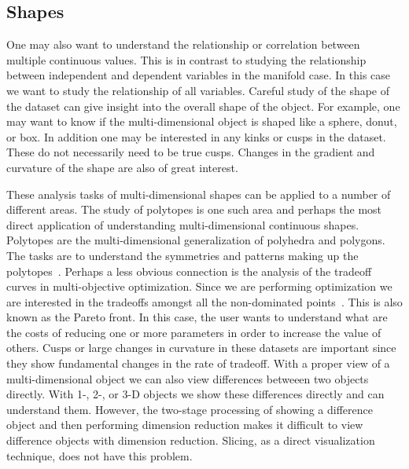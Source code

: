 \subsection{Shapes}
\label{sec:shapes}

One may also want to understand the relationship or correlation between
multiple continuous values. This is in contrast to studying the relationship
between independent and dependent variables in the manifold case. In this case
we want to study the relationship of all variables. Careful study of the shape
of the dataset can give insight into the overall shape of the object. For
example, one may want to know if the multi-dimensional object is shaped like a
sphere, donut, or box.
In addition one may be interested in any kinks or cusps in the dataset.
 These do not necessarily need to be true cusps. Changes in
the gradient and curvature of the shape are also of great interest.

These analysis tasks of multi-dimensional shapes can be applied to a number of
different areas. The study of polytopes is one such area and perhaps the most
direct application of understanding multi-dimensional continuous shapes.
Polytopes are the multi-dimensional generalization of polyhedra and polygons.
The tasks are to understand the symmetries and patterns making up the
polytopes~\cite{Ziegler}. Perhaps a less obvious connection is the analysis of
the tradeoff curves in multi-objective optimization. Since we are performing
optimization we are interested in the tradeoffs amongst all the non-dominated
points~\cite{nondominated}. This is also known as the Pareto front. In this
case, the user wants to understand what are the costs of reducing one or more
parameters in order to increase the value of others. Cusps or large changes in
curvature in these datasets are important since they show fundamental changes
in the rate of tradeoff.  With a proper view of a multi-dimensional object we
can also view differences betweeen two objects directly. With 1-, 2-, or 3-D
objects we show these differences directly and can understand them.
 However, the two-stage
processing of showing a difference object and then performing dimension
reduction makes it difficult to view difference objects with dimension
reduction. Slicing, as a direct visualization technique, does not have this
problem.


